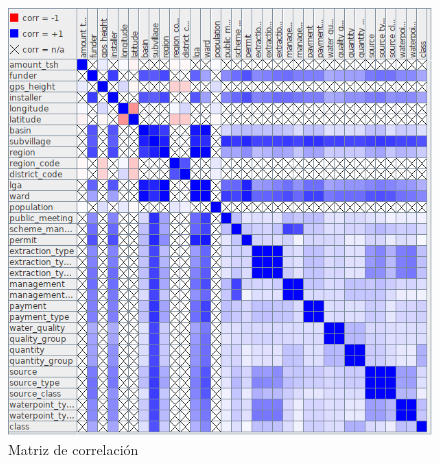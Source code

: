 \documentclass[a4paper, 20pt]{article}
\begin{document}
\begin{figure}[H]
    \centering
    \includegraphics[width=1\textwidth]{CorrelationMatrix}
    \caption{Matriz de correlación}
    \label{fig:CorrMat}
\end{figure}
\end{document}
